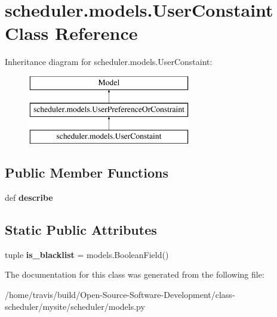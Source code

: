 \hypertarget{classscheduler_1_1models_1_1_user_constaint}{\section{scheduler.\-models.\-User\-Constaint Class Reference}
\label{classscheduler_1_1models_1_1_user_constaint}
}
Inheritance diagram for scheduler.\-models.\-User\-Constaint\-:\begin{figure}[H]
\begin{center}
\leavevmode
\includegraphics[height=3.000000cm]{classscheduler_1_1models_1_1_user_constaint}
\end{center}
\end{figure}
\subsection*{Public Member Functions}
\begin{DoxyCompactItemize}
\item 
\hypertarget{classscheduler_1_1models_1_1_user_constaint_a5a35e3eb2cd241453f4c1fbadb3c8812}{def {\bfseries describe}}\label{classscheduler_1_1models_1_1_user_constaint_a5a35e3eb2cd241453f4c1fbadb3c8812}

\end{DoxyCompactItemize}
\subsection*{Static Public Attributes}
\begin{DoxyCompactItemize}
\item 
\hypertarget{classscheduler_1_1models_1_1_user_constaint_a8817f2145d653131ad7084ad6ed71e97}{tuple {\bfseries is\-\_\-blacklist} = models.\-Boolean\-Field()}\label{classscheduler_1_1models_1_1_user_constaint_a8817f2145d653131ad7084ad6ed71e97}

\end{DoxyCompactItemize}


The documentation for this class was generated from the following file\-:\begin{DoxyCompactItemize}
\item 
/home/travis/build/\-Open-\/\-Source-\/\-Software-\/\-Development/class-\/scheduler/mysite/scheduler/models.\-py\end{DoxyCompactItemize}
